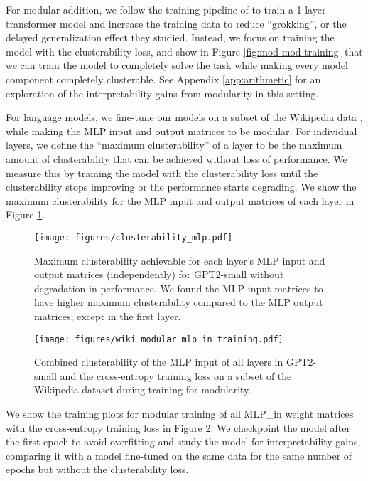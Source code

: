For modular addition, we follow the training pipeline of \citet{nanda2023progressmeasuresgrokkingmechanistic} to train a 1-layer transformer model and increase the training data to reduce ``grokking'', or the delayed generalization effect they studied. Instead, we focus on training the model with the clusterability loss, and show in Figure \ref{fig:mod-mod-training} that we can train the model to completely solve the task while making every model component completely clusterable. See Appendix \ref{app:arithmetic} for an exploration of the interpretability gains from modularity in this setting.

For language models, we fine-tune our models on a subset of the Wikipedia data \cite{merity2016pointer}, while making the MLP input and output matrices to be modular. For individual layers, we define the ``maximum clusterability'' of a layer to be the maximum amount of clusterability that can be achieved without loss of performance. We measure this by training the model with the clusterability loss until the clusterability stops improving or the performance starts degrading. We show the maximum clusterability for the MLP input and output matrices of each layer in Figure \ref{fig:mlp}.

\begin{figure}[h]
\centering
    \texttt{[image: figures/clusterability\_mlp.pdf]}
    \caption{Maximum clusterability achievable for each layer's MLP input and output matrices (independently) for GPT2-small without degradation in performance. We found the MLP input matrices to have higher maximum clusterability compared to the MLP output matrices, except in the first layer.}
    \label{fig:mlp}
\end{figure}

\begin{figure}[h]
\centering
    \texttt{[image: figures/wiki\_modular\_mlp\_in\_training.pdf]}
    \caption{Combined clusterability of the MLP input of all layers in GPT2-small and the cross-entropy training loss on a subset of the Wikipedia dataset during training for modularity.}
    \label{fig:wiki-training}
\end{figure}

We show the training plots for modular training of all MLP\_in weight matrices with the cross-entropy training loss in Figure \ref{fig:wiki-training}. We checkpoint the model after the first epoch to avoid overfitting and study the model for interpretability gains, comparing it with a model fine-tuned on the same data for the same number of epochs but without the clusterability loss.

